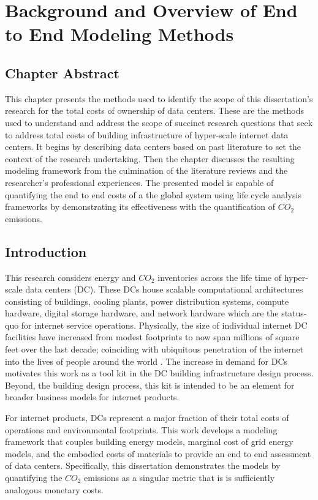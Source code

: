 \chapter{Background and Overview of End to End Modeling Methods}

\section{Chapter Abstract}

This chapter presents the methods used to identify the scope of this dissertation's research for the total costs of ownership of data centers. These are the methods used to understand and address the scope of succinct research questions that seek to address total costs of building infrastructure of hyper-scale internet data centers. It begins by describing data centers based on past literature to set the context of the research undertaking. Then the chapter discusses the resulting modeling framework from the culmination of the literature reviews and the researcher's professional experiences. The presented model is capable of quantifying the end to end costs of a the global system using life cycle analysis frameworks by demonstrating its effectiveness with the quantification of $CO_2$ emissions. 

\section{Introduction}

    This research considers energy and $CO_2$ inventories across the life time of hyper-scale data centers (DC). These DCs house scalable computational architectures consisting of buildings, cooling plants, power distribution systems, compute hardware, digital storage hardware, and network hardware which are the status-quo for internet service operations. Physically, the size of individual internet DC facilities have increased from modest footprints to now span millions of square feet over the last decade; coinciding with ubiquitous penetration of the internet into the lives of people around the world . The increase in demand for DCs motivates this work as a tool kit in the DC building infrastructure design process. Beyond, the building design process, this kit is intended to be an element for broader business models for internet products.
    
    For internet products, DCs represent a major fraction of their total costs of operations and environmental footprints.  This work develops a modeling framework that couples building energy models, marginal cost of grid energy models, and the embodied costs of materials to provide an end to end assessment of data centers. Specifically, this dissertation demonstrates the models by quantifying the $CO_2$ emissions as a singular metric that is is sufficiently analogous monetary costs.
    

